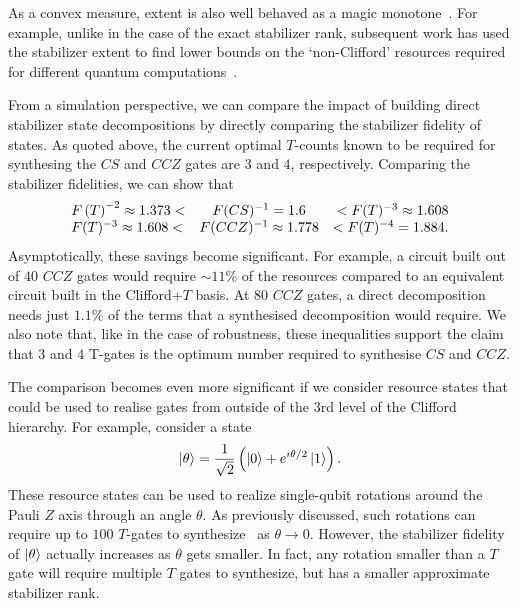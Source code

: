 As a convex measure, extent is also well behaved as a magic monotone~\cite{Regula2018}. For example, unlike in the case of the exact stabilizer rank, subsequent work has used the stabilizer extent to find lower bounds on the `non-Clifford' resources required for different quantum computations~\cite{Beverland2019}.\par
From a simulation perspective, we can compare the impact of building direct stabilizer state decompositions by directly comparing the stabilizer fidelity of states. As quoted above, the current optimal $T$-counts known to be required for synthesing the $CS$ and $CCZ$ gates are $3$ and $4$, respectively. Comparing the stabilizer fidelities, we can show that
\begin{equation}
\begin{array}{l c r}
F\left(T\right)^{-2}\approx 1.373< & F(CS)^{-1}=1.6 &< F(T)^{-3}\approx 1.608 \\
F(T)^{-3}\approx 1.608< & F(CCZ)^{-1}\approx 1.778 &< F(T)^{-4}=1.884.
\end{array}
\label{eq:c3_resource_comparison}
\end{equation}
Asymptotically, these savings become significant. For example, a circuit built out of $40$ $CCZ$ gates would require $\sim 11\%$ of the resources compared to an equivalent circuit built in the Clifford+$T$ basis. At $80$ $CCZ$ gates, a direct decomposition needs just  $1.1\%$ of the terms that a synthesised decomposition would require. We also note that, like in the case of robustness, these inequalities support the claim that $3$ and $4$ T-gates is the optimum number required to synthesise $CS$ and $CCZ$.\par
The comparison becomes even more significant if we consider resource states that could be used to realise gates from outside of the $3$rd level of the Clifford hierarchy. For example, consider a state
\begin{equation}
\ket{\theta}=\frac{1}{\sqrt{2}}\left(\ket{0}+e^{i\theta/2}\ket{1}\right).
\label{eq:theta_state}
\end{equation}
These resource states can be used to realize single-qubit rotations around the Pauli $Z$ axis through an angle $\theta$. As previously discussed, such rotations can require up to $100$ $T$-gates to synthesize~\cite{Ross2014} as $\theta\rightarrow 0$. However, the stabilizer fidelity of $\ket{\theta}$ actually increases as $\theta$ gets smaller. In fact, any rotation smaller than a $T$ gate will require multiple $T$ gates to synthesize, but has a smaller approximate stabilizer rank. \par

